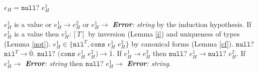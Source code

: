 \begin{case}

$e_{H}=\mathtt{null?}$ $e_{H}^{1}$

$e_{H}^{1}$ is a value or $e_{H}^{1}\rightarrow e_{H}^{2}$ or $e_{H}^{1}\rightarrow$ \emph{\textbf{Error}: string} by the induction hypothesis.  If $e_{H}^{1}$ is a value then $e_{H}^{1}:[T]$ by inversion (Lemma \ref{i}) and uniqueness of types (Lemma \ref{uot}).  $e_{H}^{1}\in\lbrace\mathtt{nil}^{T},\mathtt{cons}$ $e_{H}^{1}$ $e_{H}^{2}\rbrace$ by canonical forms (Lemma \ref{cf}).  $\mathtt{null?}$ $\mathtt{nil}^{T}\rightarrow\overline{0}$.  $\mathtt{null?}$ $(\mathtt{cons}$ $e_{H}^{1}$ $e_{H}^{2})\rightarrow\overline{1}$.  If $e_{H}^{1}\rightarrow e_{H}^{2}$ then $\mathtt{null?}$ $e_{H}^{1}\rightarrow\mathtt{null?}$ $e_{H}^{2}$.  If $e_{H}^{1}\rightarrow$ \emph{\textbf{Error}: string} then $\mathtt{null?}$ $e_{H}^{1}\rightarrow$ \emph{\textbf{Error}: string}.

\end{case}